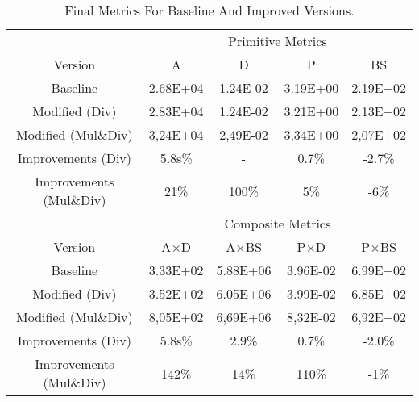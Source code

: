 \begin{table}[H]
\centering
\begin{tabular}{ccccc}

&
\multicolumn{4}{c}{Primitive Metrics}\\
Version &
\ttfamily A &
\ttfamily D &
\ttfamily P &
\ttfamily BS \\
Baseline &
\num{2.68E+04} &
\num{1.24E-02} &
\num{3.19E+00} &
\num{2.19E+02} \\
Modified (Div)&
\num{2.83E+04} &
\num{1.24E-02} &
\num{3.21E+00} &
\num{2.13E+02} \\
Modified (Mul\&Div)&
\num{3,24E+04} &
\num{2,49E-02} &
\num{3,34E+00} &
\num{2,07E+02} \\
Improvements (Div) &
\color{red} 5.8s\% &
- &
\color{red} 0.7\% &
\color{green} -2.7\% \\
Improvements (Mul\&Div) &
\color{red} 21\% &
\color{red} 100\% &
\color{red} 5\% &
\color{green} -6\% \\

\midrule

& \multicolumn{4}{c}{Composite Metrics}\\
Version &
\ttfamily A$\times$D &
\ttfamily A$\times$BS &
\ttfamily P$\times$D &
\ttfamily P$\times$BS\\
Baseline &
\num{3.33E+02} &
\num{5.88E+06} &
\num{3.96E-02} &
\num{6.99E+02} \\
Modified (Div)&
\num{3.52E+02} &
\num{6.05E+06} &
\num{3.99E-02} &
\num{6.85E+02} \\
Modified (Mul\&Div)&
\num{8,05E+02} &
\num{6,69E+06} &
\num{8,32E-02} &
\num{6,92E+02} \\
Improvements (Div) &
\color{red} 5.8s\% &
\color{red} 2.9\% &
\color{red} 0.7\% &
\color{green} -2.0\% \\
Improvements (Mul\&Div)&
\color{red} 142\% &
\color{red} 14\% &
\color{red} 110\% &
\color{green} -1\%\\
\end{tabular}
\caption{Final Metrics For Baseline And Improved Versions.}
\label{tbl:final_metrics}
\end{table}